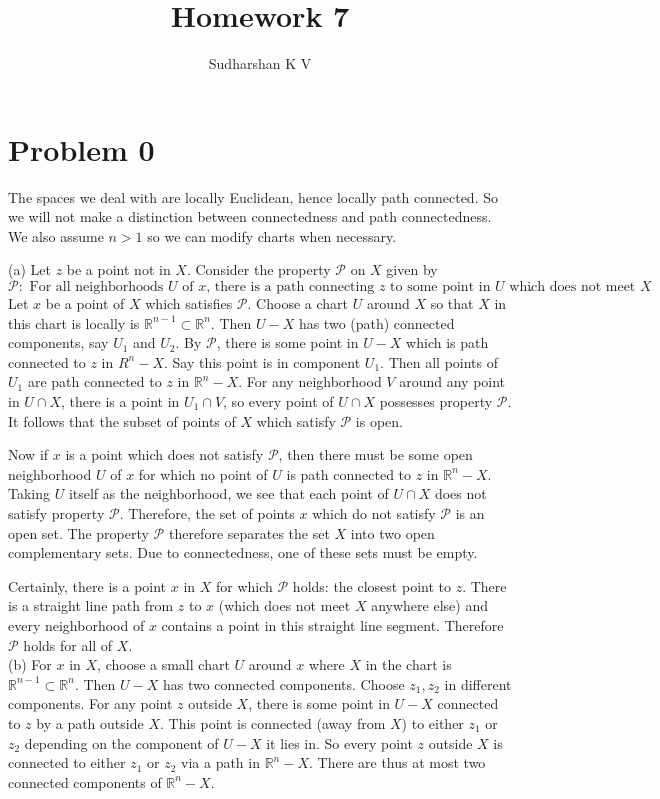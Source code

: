 \documentclass{amsart}
\title{Homework 7}
\author{Sudharshan K V}
\numberwithin{equation}{section}
\theoremstyle{plain}
\theoremstyle{definition}
\theoremstyle{remark}
\newcommand{\PP}{\mathscr{P}}
\renewcommand{\_}[2]{\underbrace{#1}_{#2}}
\renewcommand{\^}[2]{\overbrace{#1}_{#2}}
\newcommand{\R}{\mathbb{R}}
\begin{document}
\maketitle

\section*{Problem 0}
The spaces we deal with are locally Euclidean, hence locally path connected. So we will not make a distinction between connectedness and path connectedness. We also assume $n>1$ so we can modify charts when necessary.

(a) Let $z$ be a point not in $X$. Consider the property $\PP$ on $X$ given by \[\PP: \text{ For all neighborhoods $U$ of $x$, there is a path connecting $z$ to some point in $U$ which does not meet $X$}.\] Let $x$ be a point of $X$ which satisfies $\PP$. Choose a chart $U$ around $X$ so that $X$ in this chart is locally is $\R^{n-1} \subset \R^n$. Then $U-X$ has two (path) connected components, say $U_1$ and $U_2$. By $\PP$, there is some point in $U-X$ which is path connected to $z$ in $R^n-X$. Say this point is in component $U_1$. Then all points of $U_1$ are path connected to $z$ in $\R^n-X$. For any neighborhood $V$ around any point in $U\cap X$, there is a point in $U_1 \cap V$, so every point of $U\cap X$ possesses property $\PP$. It follows that the subset of points of $X$ which satisfy $\PP$ is open.

Now if $x$ is a point which does not satisfy $\PP$, then there must be some open neighborhood $U$ of $x$ for which no point of $U$ is path connected to $z$ in $\R^n-X$. Taking $U$ itself as the neighborhood, we see that each point of $U\cap X$ does not satisfy property $\PP$. Therefore, the set of points $x$ which do not satisfy $\PP$ is an open set. The property $\PP$ therefore separates the set $X$ into two open complementary sets. Due to connectedness, one of these sets must be empty.

Certainly, there is a point $x$ in $X$ for which $\PP$ holds: the closest point to $z$. There is a straight line path from $z$ to $x$ (which does not meet $X$ anywhere else) and every neighborhood of $x$ contains a point in this straight line segment. Therefore $\PP$ holds for all of $X$.\\

(b) For $x$ in $X$, choose a small chart $U$ around $x$ where $X$ in the chart is $\R^{n-1}\subset \R^n$. Then $U-X$ has two connected components. Choose $z_1, z_2$ in different components. For any point $z$ outside $X$, there is some point in $U-X$ connected to $z$ by a path outside $X$. This point is connected (away from $X$) to either $z_1$ or $z_2$ depending on the component of $U-X$ it lies in. So every point $z$ outside $X$ is connected to either $z_1$ or $z_2$ via a path in $\R^n - X$. There are thus at most two connected components of $\R^n-X$. \\
\end{document}
